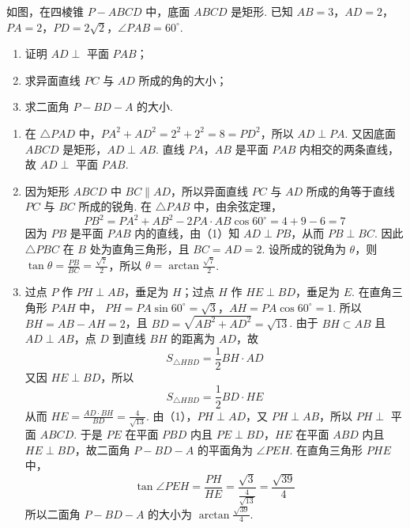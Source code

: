 \begin{problem}
如图，在四棱锥 \(P - ABCD\) 中，底面 \(ABCD\) 是矩形. 已知 \(AB = 3\)，\(AD = 2\)，\(PA = 2\)，\(PD = 2\sqrt{2}\)，\(\angle PAB = 60^\circ\).
\begin{enumerate}
\item 证明 \(AD \perp\) 平面 \(PAB\)；
\item 求异面直线 \(PC\) 与 \(AD\) 所成的角的大小；
\item 求二面角 \(P - BD - A\) 的大小.
\end{enumerate}

\end{problem}

\begin{solution}
\begin{enumerate}
\item 在 \(\triangle PAD\) 中，\(PA^2+AD^2=2^2+2^2=8=PD^2\)，所以 \(AD\perp PA\). 又因底面 \(ABCD\) 是矩形，\(AD\perp AB\). 直线 \(PA\)，\(AB\) 是平面 \(PAB\) 内相交的两条直线，故 \(AD\perp\) 平面 \(PAB\).
\item 因为矩形 \(ABCD\) 中 \(BC\parallel AD\)，所以异面直线 \(PC\) 与 \(AD\) 所成的角等于直线 \(PC\) 与 \(BC\) 所成的锐角. 在 \(\triangle PAB\) 中，由余弦定理，
\[
PB^2=PA^2+AB^2-2PA\cdot AB\cos60^\circ=4+9-6=7
\]
因为 \(PB\) 是平面 \(PAB\) 内的直线，由（1）知 \(AD\perp PB\)，从而 \(PB\perp BC\). 因此 \(\triangle PBC\) 在 \(B\) 处为直角三角形，且 \(BC=AD=2\). 设所成的锐角为 \(\theta\)，则 \(\tan\theta=\frac{PB}{BC}=\frac{\sqrt{7}}{2}\)，所以 \(\theta=\arctan\frac{\sqrt{7}}{2}\).
\item 过点 \(P\) 作 \(PH\perp AB\)，垂足为 \(H\)；过点 \(H\) 作 \(HE\perp BD\)，垂足为 \(E\). 在直角三角形 \(PAH\) 中，
\(PH=PA\sin60^\circ=\sqrt{3}\)，\(AH=PA\cos60^\circ=1\).
所以 \(BH=AB-AH=2\)，且 \(BD=\sqrt{AB^2+AD^2}=\sqrt{13}\). 由于 \(BH\subset AB\) 且 \(AD\perp AB\)，点 \(D\) 到直线 \(BH\) 的距离为 \(AD\)，故
\[
S_{\triangle HBD}=\frac{1}{2}BH\cdot AD
\]
又因 \(HE\perp BD\)，所以
\[
S_{\triangle HBD}=\frac{1}{2}BD\cdot HE
\]
从而 \(HE=\frac{AD\cdot BH}{BD}=\frac{4}{\sqrt{13}}\).
由（1），\(PH\perp AD\)，又 \(PH\perp AB\)，所以 \(PH\perp\) 平面 \(ABCD\). 于是 \(PE\) 在平面 \(PBD\) 内且 \(PE\perp BD\)，\(HE\) 在平面 \(ABD\) 内且 \(HE\perp BD\)，故二面角 \(P-BD-A\) 的平面角为 \(\angle PEH\). 在直角三角形 \(PHE\) 中，
\[
\tan\angle PEH=\frac{PH}{HE}=\frac{\sqrt{3}}{\frac{4}{\sqrt{13}}}=\frac{\sqrt{39}}{4}
\]
所以二面角 \(P-BD-A\) 的大小为 \(\arctan\frac{\sqrt{39}}{4}\).
\end{enumerate}
\end{solution}

